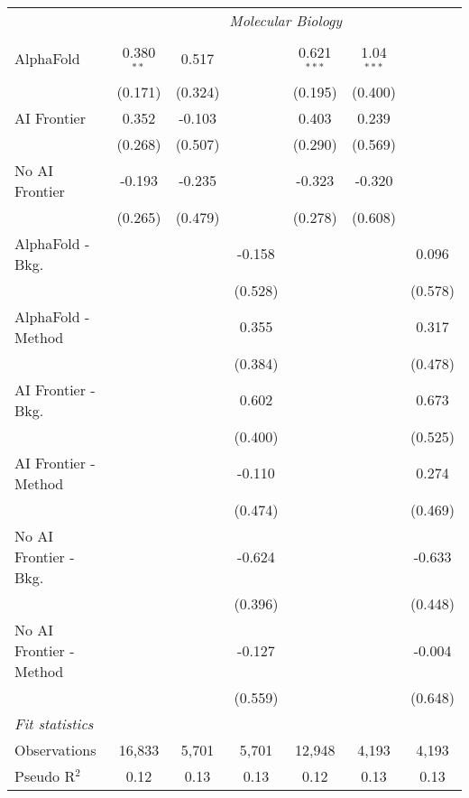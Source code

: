 \begin{tabular}{lcccccc}
 & \multicolumn{6}{c}{\textit{Molecular Biology}} \\ \\
   AlphaFold               & 0.380$^{**}$ & 0.517   &         & 0.621$^{***}$ & 1.04$^{***}$ &   \\   
                           & (0.171)      & (0.324) &         & (0.195)       & (0.400)      &   \\   
   AI Frontier             & 0.352        & -0.103  &         & 0.403         & 0.239        &   \\   
                           & (0.268)      & (0.507) &         & (0.290)       & (0.569)      &   \\   
   No AI Frontier          & -0.193       & -0.235  &         & -0.323        & -0.320       &   \\   
                           & (0.265)      & (0.479) &         & (0.278)       & (0.608)      &   \\   
   AlphaFold - Bkg.        &              &         & -0.158  &               &              & 0.096\\   
                           &              &         & (0.528) &               &              & (0.578)\\   
   AlphaFold - Method      &              &         & 0.355   &               &              & 0.317\\   
                           &              &         & (0.384) &               &              & (0.478)\\   
   AI Frontier - Bkg.      &              &         & 0.602   &               &              & 0.673\\   
                           &              &         & (0.400) &               &              & (0.525)\\   
   AI Frontier - Method    &              &         & -0.110  &               &              & 0.274\\   
                           &              &         & (0.474) &               &              & (0.469)\\   
   No AI Frontier - Bkg.   &              &         & -0.624  &               &              & -0.633\\   
                           &              &         & (0.396) &               &              & (0.448)\\   
   No AI Frontier - Method &              &         & -0.127  &               &              & -0.004\\   
                           &              &         & (0.559) &               &              & (0.648)\\   
   \midrule
   \emph{Fit statistics}\\
   Observations            & 16,833       & 5,701   & 5,701   & 12,948        & 4,193        & 4,193\\  
   Pseudo R$^2$            & 0.12         & 0.13    & 0.13    & 0.12          & 0.13         & 0.13\\  
   

\end{tabular}
